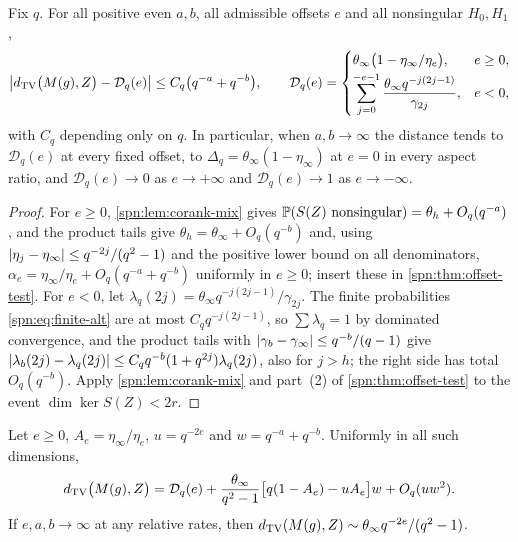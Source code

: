 \begin{theorem}\label{spn:thm:offset-profile}
Fix $q$. For all positive even $a,b$, all admissible offsets $e$ and all nonsingular $H_0,H_1$,
\[
 \bigl|d_{\mathrm{TV}}\bigl(M(g),Z\bigr)-\mathcal D_q(e)\bigr|\le C_q\bigl(q^{-a}+q^{-b}\bigr),\qquad
 \mathcal D_q(e)=
 \begin{cases}
 \theta_\infty\bigl(1-\eta_\infty/\eta_e\bigr),&e\ge0,\\[2pt]
 \displaystyle\sum_{j=0}^{-e-1}\frac{\theta_\infty q^{-j(2j-1)}}{\gamma_{2j}},&e<0,
 \end{cases}
\]
with $C_q$ depending only on $q$. In particular, when $a,b\to\infty$ the distance tends to
$\mathcal D_q(e)$ at every fixed offset, to $\Delta_q=\theta_\infty(1-\eta_\infty)$ at $e=0$ in
every aspect ratio, and $\mathcal D_q(e)\to0$ as $e\to+\infty$ and $\mathcal D_q(e)\to1$ as
$e\to-\infty$.
\end{theorem}

\begin{proof}
For $e\ge0$, \cref{spn:lem:corank-mix} gives
$\mathbb{P}(S(Z)\text{ nonsingular})=\theta_h+O_q(q^{-a})$, and the product tails give
$\theta_h=\theta_\infty+O_q(q^{-b})$ and, using $\lvert\eta_j-\eta_\infty\rvert\le q^{-2j}/(q^2-1)$ and
the positive lower bound on all denominators,
$\alpha_e=\eta_\infty/\eta_e+O_q(q^{-a}+q^{-b})$ uniformly in $e\ge0$; insert these in
\cref{spn:thm:offset-test}. For $e<0$, let $\lambda_q(2j)=\theta_\infty q^{-j(2j-1)}/\gamma_{2j}$.
The finite probabilities \eqref{spn:eq:finite-alt} are at most $C_qq^{-j(2j-1)}$, so
$\sum\lambda_q=1$ by dominated convergence, and the product tails with
$\lvert\gamma_b-\gamma_\infty\rvert\le q^{-b}/(q-1)$ give
$\lvert\lambda_b(2j)-\lambda_q(2j)\rvert\le C_qq^{-b}(1+q^{2j})\lambda_q(2j)$, also for $j>h$; the right
side has total $O_q(q^{-b})$. Apply \cref{spn:lem:corank-mix} and part~(2) of
\cref{spn:thm:offset-test} to the event $\dim\ker S(Z)<2r$.
\end{proof}

\begin{corollary}\label{spn:cor:offset-first}
Let $e\ge0$, $A_e=\eta_\infty/\eta_e$, $u=q^{-2e}$ and $w=q^{-a}+q^{-b}$. Uniformly in all such
dimensions,
\[
 d_{\mathrm{TV}}\bigl(M(g),Z\bigr)=\mathcal D_q(e)+\frac{\theta_\infty}{q^2-1}\bigl[q(1-A_e)-uA_e\bigr]w
 +O_q(uw^2).
\]
If $e,a,b\to\infty$ at any relative rates, then
$d_{\mathrm{TV}}(M(g),Z)\sim\theta_\infty q^{-2e}/(q^2-1)$.
\end{corollary}

